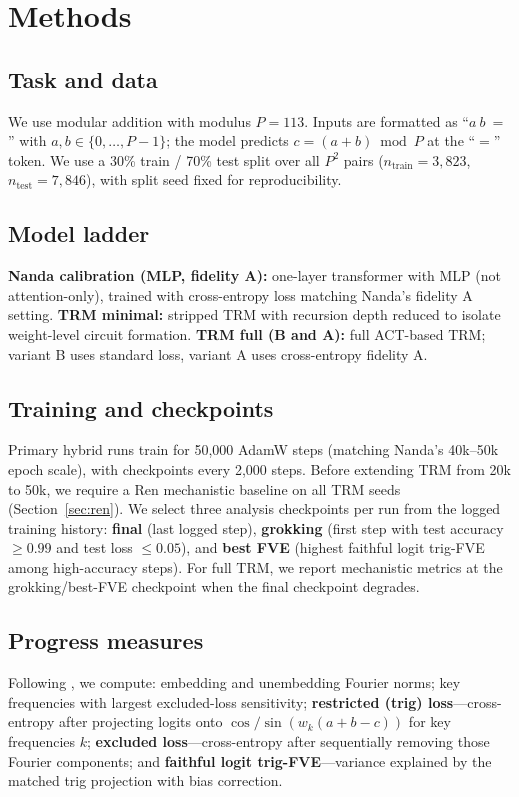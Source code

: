 \section{Methods}

\subsection{Task and data}
We use modular addition with modulus $P{=}113$.
Inputs are formatted as ``$a\ b\ =$'' with $a,b\in\{0,\ldots,P{-}1\}$; the model predicts $c=(a+b)\bmod P$ at the ``$=$'' token.
We use a 30\% train / 70\% test split over all $P^2$ pairs ($n_{\mathrm{train}}{=}3{,}823$, $n_{\mathrm{test}}{=}7{,}846$), with split seed fixed for reproducibility.

\subsection{Model ladder}
\textbf{Nanda calibration (MLP, fidelity A):} one-layer transformer with MLP (not attention-only), trained with cross-entropy loss matching Nanda's fidelity A setting.
\textbf{TRM minimal:} stripped TRM with recursion depth reduced to isolate weight-level circuit formation.
\textbf{TRM full (B and A):} full ACT-based TRM; variant B uses standard loss, variant A uses cross-entropy fidelity A.

\subsection{Training and checkpoints}
Primary hybrid runs train for 50{,}000 AdamW steps (matching Nanda's 40k--50k epoch scale), with checkpoints every 2{,}000 steps.
Before extending TRM from 20k to 50k, we require a Ren mechanistic baseline on all TRM seeds (Section~\ref{sec:ren}).
We select three analysis checkpoints per run from the logged training history:
\textbf{final} (last logged step),
\textbf{grokking} (first step with test accuracy $\geq 0.99$ and test loss $\leq 0.05$),
and \textbf{best FVE} (highest faithful logit trig-FVE among high-accuracy steps).
For full TRM, we report mechanistic metrics at the grokking/best-FVE checkpoint when the final checkpoint degrades.

\subsection{Progress measures}
Following \citet{nanda2023progress}, we compute:
embedding and unembedding Fourier norms;
key frequencies with largest excluded-loss sensitivity;
\textbf{restricted (trig) loss}---cross-entropy after projecting logits onto $\cos/\sin(w_k(a+b-c))$ for key frequencies $k$;
\textbf{excluded loss}---cross-entropy after sequentially removing those Fourier components;
and \textbf{faithful logit trig-FVE}---variance explained by the matched trig projection with bias correction.

